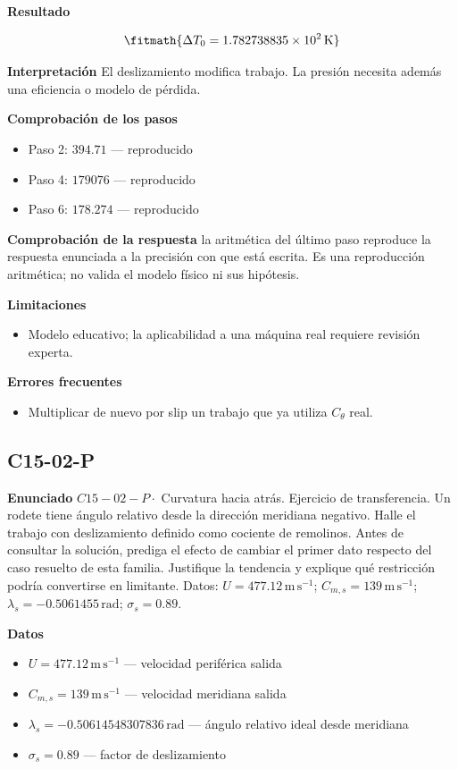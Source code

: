 \documentclass[10pt,openany]{book}
\begin{document}
\noindent\textbf{Resultado}

\[
\fitmath{\Delta T_0=1.782738835\times10^{2}\,\mathrm{K}}
\]

\noindent\textbf{Interpretación}
El deslizamiento modifica trabajo. La presión necesita además una eficiencia o modelo de pérdida.

\noindent\textbf{Comprobación de los pasos}
\begin{itemize}
\item Paso 2: $394.71$ — reproducido
\item Paso 4: $179076$ — reproducido
\item Paso 6: $178.274$ — reproducido
\end{itemize}

\noindent\textbf{Comprobación de la respuesta} la aritmética del último paso reproduce la respuesta enunciada a la precisión con que está escrita. Es una reproducción aritmética; no valida el modelo físico ni sus hipótesis.

\noindent\textbf{Limitaciones}
\begin{itemize}
\item Modelo educativo; la aplicabilidad a una máquina real requiere revisión experta.
\end{itemize}

\noindent\textbf{Errores frecuentes}
\begin{itemize}
\item Multiplicar de nuevo por slip un trabajo que ya utiliza $C_\theta$ real.
\end{itemize}
\subsection*{C15-02-P}

\noindent\textbf{Enunciado}
\(C15-02-P \cdot\) Curvatura hacia atrás. Ejercicio de transferencia. Un rodete tiene ángulo relativo desde la dirección meridiana negativo. Halle el trabajo con deslizamiento definido como cociente de remolinos. Antes de consultar la solución, prediga el efecto de cambiar el primer dato respecto del caso resuelto de esta familia. Justifique la tendencia y explique qué restricción podría convertirse en limitante. Datos: \(U=477.12\, \mathrm{m}\,\mathrm{s}^{-1}\); \(C_{m,s}=139\, \mathrm{m}\,\mathrm{s}^{-1}\); \(\lambda_s=-0.5061455\, \mathrm{rad}\); \(\sigma_s=0.89\).

\noindent\textbf{Datos}
\begin{itemize}
\item $U = 477.12\,\mathrm{m}\,\mathrm{s}^{-1}$ — velocidad periférica salida
\item $C_{m,s} = 139\,\mathrm{m}\,\mathrm{s}^{-1}$ — velocidad meridiana salida
\item $\lambda_s = -0.50614548307836\,\mathrm{rad}$ — ángulo relativo ideal desde meridiana
\item $\sigma_s = 0.89$ — factor de deslizamiento
\end{itemize}
\end{document}
